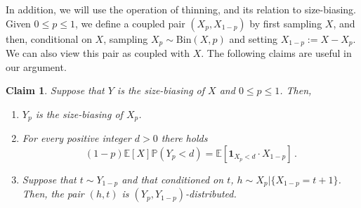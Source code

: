 \documentclass[10pt,a4paper]{amsart}
\numberwithin{equation}{section}
\newtheorem{claim}[theorem]{Claim}
\newcommand{\E}{\mathbb E}
\renewcommand{\P}{\mathbb P}
\newcommand{\Bin}{\mathrm{Bin}}
\begin{document}
In addition, we will use the operation of thinning, and its relation to size-biasing. Given $0\le p \le 1$, we define a coupled pair $(X_p,X_{1-p})$ by 
first sampling $X$, and then, conditional on $X$, sampling $X_p\sim \Bin(X,p)$ and setting $X_{1-p}:=X-X_p$. We can also view this pair as coupled with $X$.
The following claims are useful in our argument.
\begin{claim}\label{clm:sizeBias_new_claim}
Suppose that $Y$ is the size-biasing of $X$ and $0\le p\le 1$. Then,
\begin{enumerate}
\item $Y_p$ is the size-biasing of $X_p$.
\item For every positive integer $d>0$ there holds $$(1-p)\E[X]\P(Y_p<d)=\E[\mathbf 1_{X_p<d}\cdot X_{1-p}]\,.$$
\item Suppose that $t\sim Y_{1-p}$ and that conditioned on $t$, $h\sim X_p | \{X_{1-p}=t+1\}$. Then, the pair $(h,t)$ is $(Y_p,Y_{1-p})$-distributed.
\end{enumerate}
\end{claim}
\end{document}
